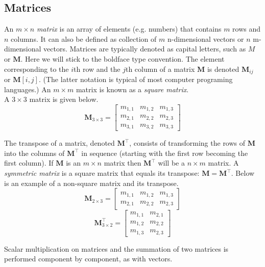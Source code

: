 \documentclass[12pt]{article}
\begin{document}
\subsection{Matrices}

An $m\times n$ \emph{matrix} is an array of elements (e.g. numbers) that contains $m$ rows and $n$ columns. It can also be defined as collection of $m$ n-dimensional vectors or $n$ m-dimensional vectors. Matrices are typically denoted as capital letters, such as $M$ or $\mathbf{M}$. Here we will stick to the boldface type convention. The element corresponding to the $i$th row and the $j$th column of a matrix $\mathbf{M}$ is denoted $\mathbf{M}_{ij}$ or $\mathbf{M}[i,j]$. (The latter notation is typical of most computer programing languages.) An $m\times m$ matrix is known as a \emph{square matrix}. \\

A $3\times3$ matrix is given below.
\[
\mathbf{M}_{3\times3}=
\begin{bmatrix}
  m_{1,1} & m_{1,2} & m_{1,3} \\
  m_{2,1} & m_{2,2} & m_{2,3} \\
  m_{3,1} & m_{3,2} & m_{3,3} 
 \end{bmatrix}
 \]

The transpose of a matrix, denoted $\mathbf{M}^\top$, consists of transforming the rows of $\mathbf{M}$ into the columns of  $\mathbf{M}^\top$ in sequence (starting with the first row becoming the first column). If $\mathbf{M}$ is an $m\times n$ matrix then $\mathbf{M}^\top$ will be a $n\times m$ matrix. A \emph{symmetric matrix} is a square matrix that equals its transpose: $\mathbf{M}=\mathbf{M}^\top$. Below is an example of a non-square matrix and its transpose.\\
\[
\mathbf{M}_{2\times 3}=
\begin{bmatrix}
  m_{1,1} & m_{1,2} & m_{1,3} \\
  m_{2,1} & m_{2,2} & m_{2,3} 
 \end{bmatrix}
 \]
 \[
 \mathbf{M}^\top_{3\times 2}=
\begin{bmatrix}
  m_{1,1} & m_{2,1}  \\
  m_{1,2} & m_{2,2}  \\
  m_{1,3} & m_{2,3}   
 \end{bmatrix}
 \]

Scalar multiplication on matrices and the summation of two matrices is performed component by component, as with vectors. \\
\end{document}

